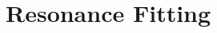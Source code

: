 \documentclass[Dissertation.tex]{subfiles}
\begin{document}
%
%
%
%
%


\section{Resonance Fitting}
\label{sec:ResonanceFit}
\end{document}

